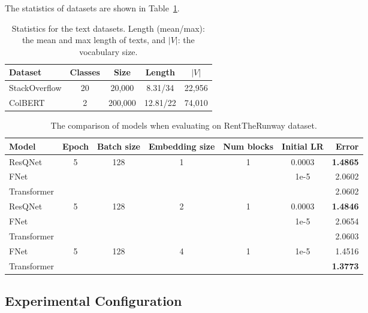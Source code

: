 The statistics of datasets are shown in Table~\ref{table:dataset-statistic}.

\begin{table}[htb!]
    \centering
    \begin{tabular}{ l|c|c|c|c  }
        \hline
        Dataset & Classes & Size & Length & $|V|$ \\
        \hline
        StackOverflow & 20 & 20,000 & 8.31/34 & 22,956 \\
        ColBERT & 2 & 200,000 & 12.81/22 & 74,010\\
        \hline
    \end{tabular}
    \caption{Statistics for the text datasets. Length (mean/max): the mean and max length of texts, and $|V|$: the vocabulary size.}
    \label{table:dataset-statistic}
\end{table}

\begin{table*}[htb!]
    \centering
    \begin{tabular}{ |l|c|c|c|c|c|r|  }
        \hline
        Model & Epoch & Batch size & Embedding size & Num blocks & Initial LR & Error \\
        \hline
        ResQNet & 5 & 128 & 1 & 1 & 0.0003 & \textbf{1.4865}\\
        FNet & & & & & 1e-5 & 2.0602 \\
        Transformer & & & & & & 2.0602 \\
        \hline
        ResQNet & 5 & 128 & 2 & 1 & 0.0003 & \textbf{1.4846} \\
        FNet & & & & & 1e-5 & 2.0654 \\
        Transformer & & & & & & 2.0603 \\
        \hline
        FNet & 5 & 128 & 4 & 1 & 1e-5 & 1.4516 \\
        Transformer & & & & & & \textbf{1.3773} \\
        \hline
    \end{tabular}
    \caption{The comparison of models when evaluating on RentTheRunway dataset.}
    \label{table:renttherunway}
\end{table*}

\subsection{Experimental Configuration}


